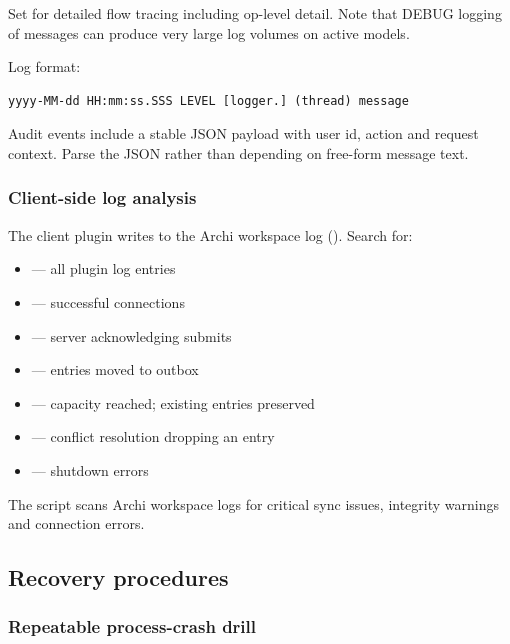 Set  for detailed flow tracing including
op-level detail. Note that DEBUG logging of  messages
can produce very large log volumes on active models.

Log format:

\begin{lstlisting}[caption={Log format}]
yyyy-MM-dd HH:mm:ss.SSS LEVEL [logger.] (thread) message
\end{lstlisting}

Audit events include a stable JSON payload with user id, action and request
context. Parse the JSON rather than depending on free-form message text.

\subsubsection{Client-side log analysis}

The client plugin writes to the Archi workspace log
(). Search for:

\begin{itemize}
\item {} --- all plugin log entries
\item {} --- successful connections
\item {} --- server acknowledging submits
\item {} --- entries moved to outbox
\item {} --- capacity reached; existing entries preserved
\item {} --- conflict resolution dropping an entry
\item {} --- shutdown errors
\end{itemize}

The  script scans Archi workspace
logs for critical sync issues, integrity warnings and connection errors.

\subsection{Recovery procedures}

\subsubsection{Repeatable process-crash drill}

